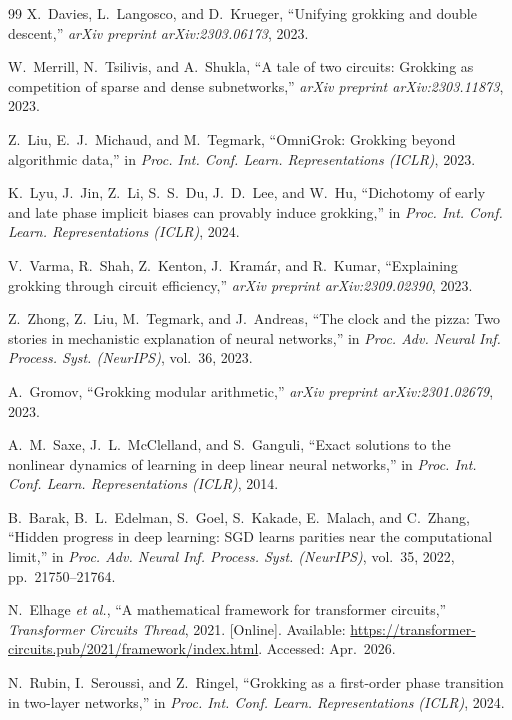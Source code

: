 \documentclass[12pt,openany,a4paper]{book}
\begin{document}
{\begin{thebibliography}{99}
X.~Davies, L.~Langosco, and D.~Krueger,
``Unifying grokking and double descent,''
\textit{arXiv preprint arXiv:2303.06173}, 2023.

W.~Merrill, N.~Tsilivis, and A.~Shukla,
``A tale of two circuits: Grokking as competition of sparse and
dense subnetworks,''
\textit{arXiv preprint arXiv:2303.11873}, 2023.

Z.~Liu, E.~J.~Michaud, and M.~Tegmark,
``OmniGrok: Grokking beyond algorithmic data,''
in \textit{Proc. Int. Conf. Learn. Representations (ICLR)}, 2023.

K.~Lyu, J.~Jin, Z.~Li, S.~S.~Du, J.~D.~Lee, and W.~Hu,
``Dichotomy of early and late phase implicit biases can provably
induce grokking,''
in \textit{Proc. Int. Conf. Learn. Representations (ICLR)}, 2024.

V.~Varma, R.~Shah, Z.~Kenton, J.~Kram\'{a}r, and R.~Kumar,
``Explaining grokking through circuit efficiency,''
\textit{arXiv preprint arXiv:2309.02390}, 2023.

Z.~Zhong, Z.~Liu, M.~Tegmark, and J.~Andreas,
``The clock and the pizza: Two stories in mechanistic explanation
of neural networks,''
in \textit{Proc. Adv. Neural Inf. Process. Syst. (NeurIPS)},
vol.~36, 2023.

A.~Gromov,
``Grokking modular arithmetic,''
\textit{arXiv preprint arXiv:2301.02679}, 2023.

A.~M.~Saxe, J.~L.~McClelland, and S.~Ganguli,
``Exact solutions to the nonlinear dynamics of learning in deep
linear neural networks,''
in \textit{Proc. Int. Conf. Learn. Representations (ICLR)}, 2014.

B.~Barak, B.~L.~Edelman, S.~Goel, S.~Kakade, E.~Malach, and
C.~Zhang, ``Hidden progress in deep learning: SGD learns parities
near the computational limit,'' in \textit{Proc. Adv. Neural Inf.
Process. Syst. (NeurIPS)}, vol.~35, 2022, pp.~21750--21764.

N.~Elhage \textit{et al.},
``A mathematical framework for transformer circuits,''
\textit{Transformer Circuits Thread}, 2021.
[Online]. Available:
\url{https://transformer-circuits.pub/2021/framework/index.html}.
Accessed: Apr.\ 2026.

N.~Rubin, I.~Seroussi, and Z.~Ringel,
``Grokking as a first-order phase transition in two-layer networks,''
in \textit{Proc. Int. Conf. Learn. Representations (ICLR)}, 2024.


\end{thebibliography}}
\end{document}
